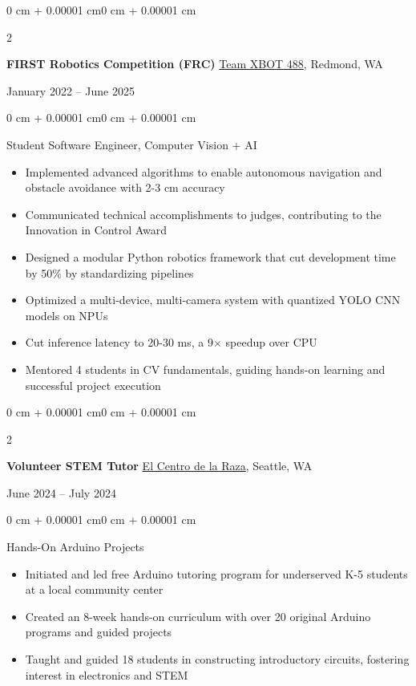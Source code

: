 \documentclass[11pt, letterpaper]{article}
\newenvironment{highlights}{
    \begin{itemize}[
        topsep=0.06 cm,
        parsep=0.06 cm,
        partopsep=0pt,
        itemsep=0pt,
        leftmargin=0 cm + 10pt
    ]
}{\end{itemize}}
\newenvironment{onecolentry}{
    \begin{adjustwidth}{0 cm + 0.00001 cm}{0 cm + 0.00001 cm}
}{\end{adjustwidth}}
\newenvironment{bodyonecolentry}{
    \begin{onecolentry}\small
}{\end{onecolentry}}
\newenvironment{twocolentry}[2][]{
    \onecolentry
    \def\secondColumn{#2}
    \setcolumnwidth{\fill, 4.5 cm}
    \begin{paracol}{2}
}{
    \switchcolumn \raggedleft \secondColumn
    \end{paracol}
    \endonecolentry
}
\let\hrefWithoutArrow\href
\begin{document}
    \begin{twocolentry}{January 2022 -- June 2025}
        \textbf{FIRST Robotics Competition (FRC)} \hrefWithoutArrow{https://www.xbotrobotics.org/competitive-robotics}{Team XBOT 488}, Redmond, WA
    \end{twocolentry}
    \vspace{0.08 cm}
    \begin{bodyonecolentry}
        Student Software Engineer, Computer Vision + AI
        \begin{highlights}
            \item Implemented advanced algorithms to enable autonomous navigation and obstacle avoidance with 2-3 cm accuracy
            \item Communicated technical accomplishments to judges, contributing to the Innovation in Control Award
            \item Designed a modular Python robotics framework that cut development time by 50\% by standardizing pipelines
            \item Optimized a multi-device, multi-camera system with quantized YOLO CNN models on NPUs
            \item Cut inference latency to 20-30 ms, a 9$\times$ speedup over CPU
            \item Mentored 4 students in CV fundamentals, guiding hands-on learning and successful project execution
        \end{highlights}
    \end{bodyonecolentry}

    \vspace{0.12 cm}

    \begin{twocolentry}{June 2024 -- July 2024}
        \textbf{Volunteer STEM Tutor} \hrefWithoutArrow{https://www.elcentrodelaraza.org/}{El Centro de la Raza}, Seattle, WA
    \end{twocolentry}
    \vspace{0.08 cm}
    \begin{bodyonecolentry}
        Hands-On Arduino Projects
        \begin{highlights}
            \item Initiated and led free Arduino tutoring program for underserved K-5 students at a local community center
            \item Created an 8-week hands-on curriculum with over 20 original Arduino programs and guided projects
            \item Taught and guided 18 students in constructing introductory circuits, fostering interest in electronics and STEM
        \end{highlights}
    \end{bodyonecolentry}
\end{document}
